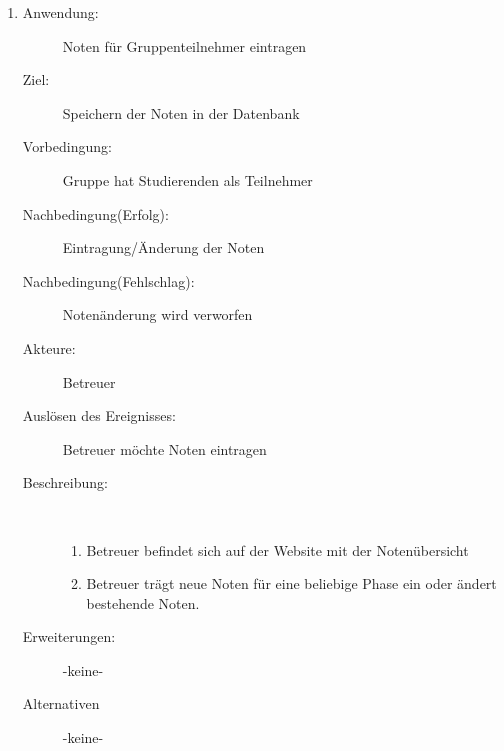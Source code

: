 \documentclass[parskip=full]{scrartcl}
\newcommand{\swtLabel}[1]{\textbf{\textbackslash #1\arabic*0\textbackslash}}
\begin{document}
\begin{enumerate} [label=\swtLabel{B}]
  
  \item
    \begin{description}
  	\item[Anwendung:] Noten für Gruppenteilnehmer eintragen
  	\item[Ziel:] Speichern der Noten in der Datenbank
  	\item[Vorbedingung:] Gruppe hat Studierenden als Teilnehmer
  	\item[Nachbedingung(Erfolg):] Eintragung/Änderung der Noten
  	\item[Nachbedingung(Fehlschlag):] Notenänderung wird verworfen
  	\item[Akteure:] Betreuer
  	\item[Auslösen des Ereignisses:] Betreuer möchte Noten eintragen
  	\item[Beschreibung:]~
  	\begin{enumerate} 
  	  \item Betreuer befindet sich auf der Website mit der Notenübersicht
  	  \item Betreuer trägt neue Noten für eine beliebige Phase ein oder ändert bestehende Noten.
  	\end{enumerate}
  	\item[Erweiterungen:] -keine-
  	\item[Alternativen] -keine-
  \end{description}
   
\end{enumerate}
\end{document}
